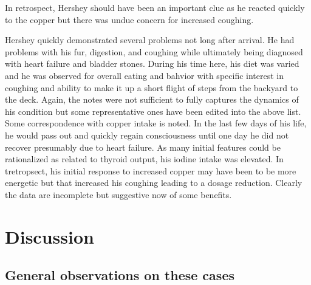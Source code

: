 In retrospect, Hershey should have been an important clue
as he reacted quickly to the copper but there was undue concern
for increased coughing.

\mjmhersheycu

\mjmhersheytable


Hershey quickly demonstrated several problems not long after arrival.
He had problems with his fur, digestion, and coughing while ultimately
being diagnosed with heart failure and bladder stones.
During his time here, his diet was varied and he was observed
for overall eating and bahvior with specific interest in 
coughing and ability to make it up a short flight of steps
from the backyard to the deck. Again, the notes were not sufficient
to fully captures the dynamics of his condition but some representative
ones have been edited into the above list. Some correspondence with
copper intake is noted. In the last few days of his life, he
would pass out and quickly regain consciousness until one day 
he did not recover presumably due to heart failure. 
As many initial features could be rationalized as related to thyroid output,
his iodine intake was elevated. 
In tretropsect, his initial response to increased copper may have been
to be more energetic but that increased his coughing leading
to a dosage reduction. Clearly the data are incomplete but suggestive
now of some benefits. 



\section{Discussion }

\subsection{ General observations on these cases }

